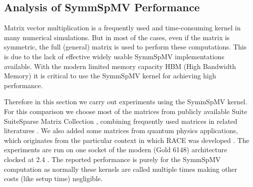 \subsection{Analysis of SymmSpMV Performance}
Matrix vector multiplication is a frequently used and time-consuming kernel in
many numerical simulations. But in most of the cases, even if the matrix is symmetric,
the full (general) matrix is used to perform these computations.
This is due to the lack of effective widely usable \acrshort{SymmSpMV} implementations available.
With the modern limited memory capacity HBM (High Bandwidth Memory) it 
is critical to use the \acrshort{SymmSpMV} kernel for achieving high performance.

Therefore in this section we carry out experiments using the \acrshort{SymmSpMV} kernel.
For this comparison we choose most of the matrices from publicly available Suite
SuiteSparse Matrix Collection \cite{UOF}, combining frequently 
used matrices in related literatures \cite{RSB,park_ls}. We also added
some matrices from quantum physics applications, which originates from 
the particular context in which \acrshort{RACE} was developed \cite{ESSEX}.
The experiments are
run on one socket of the modern \Intel \SKX (Gold 6148) architecture
clocked at 2.4 \GHZ. The reported performance is purely for the \acrshort{SymmSpMV}
computation as normally these kernels are called multiple times making other
costs (like setup time) negligible.

